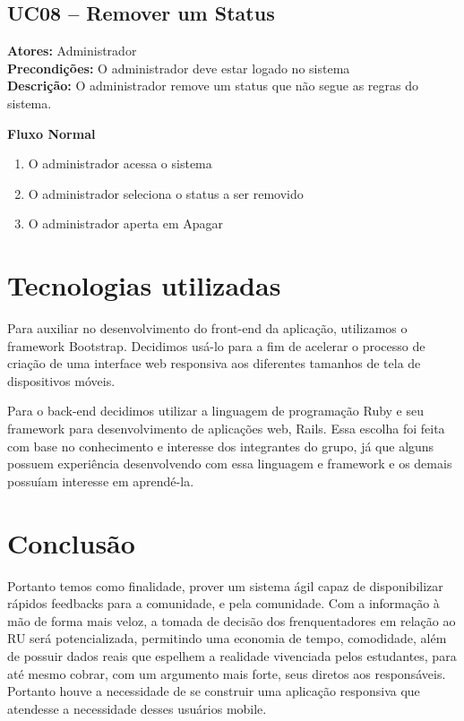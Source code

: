 \documentclass[12pt]{article}
\begin{document}
\subsection{UC08 -- Remover um Status}
\textbf{Atores:} Administrador \\
\textbf{Precondições:} O administrador deve estar logado no sistema \\
\textbf{Descrição:} O administrador remove um status que não segue as regras do sistema.

\textbf{Fluxo Normal}
\begin{enumerate}
  \item O administrador acessa o sistema
  \item O administrador seleciona o status a ser removido
  \item O administrador aperta em Apagar
\end{enumerate}


\section{Tecnologias utilizadas}


Para auxiliar no desenvolvimento do front-end da aplicação, utilizamos o framework Bootstrap. 
Decidimos usá-lo para a fim de acelerar o processo de criação de uma interface web responsiva aos
diferentes tamanhos de tela de dispositivos móveis. 

Para o back-end decidimos utilizar a linguagem de programação Ruby e seu framework para 
desenvolvimento de aplicações web, Rails. Essa escolha foi feita com base no conhecimento e interesse
dos integrantes do grupo, já que alguns possuem experiência desenvolvendo com essa linguagem e framework e os demais possuíam interesse em aprendé-la.


\section{Conclusão}

Portanto temos como finalidade, prover um sistema ágil capaz de disponibilizar
rápidos feedbacks para a comunidade, e pela comunidade. Com a informação à mão de forma mais veloz, 
a tomada de decisão dos frenquentadores em relação ao RU será potencializada, permitindo uma
economia de tempo, comodidade, além de possuir dados reais que espelhem a realidade vivenciada
pelos estudantes, para até mesmo cobrar, com um argumento mais forte, seus diretos aos responsáveis.
Portanto houve a necessidade de se construir uma aplicação responsiva que atendesse a necessidade 
desses usuários mobile.

%
%
%
%
%
\end{document}
